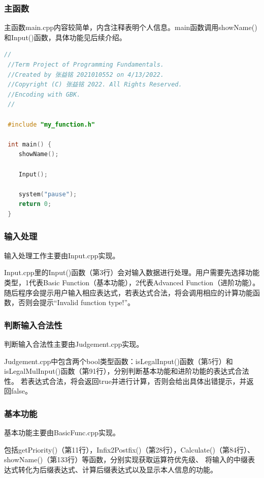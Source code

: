 \documentclass[a4paper, 11pt, UTF8]{ctexart}
\begin{document}
\subsubsection{主函数}

主函数main.cpp内容较简单，内含注释表明个人信息。main函数调用showName()和Input()函数，具体功能见后续介绍。

\begin{lstlisting}[language=C++, basicstyle=\ttfamily]
 //
 //Term Project of Programming Fundamentals.
 //Created by 张益铭 2021010552 on 4/13/2022.
 //Copyright (C) 张益铭 2022. All Rights Reserved.
 //Encoding with GBK.
 //

 #include "my_function.h"

 int main() {
    showName();
    
    Input();
    
    system("pause");
    return 0;
 }    
\end{lstlisting}

\subsubsection{输入处理}

输入处理工作主要由Input.cpp实现。

Input.cpp里的Input()函数（第3行）会对输入数据进行处理。用户需要先选择功能类型，1代表Basic Function（基本功能），2代表Advanced Function（进阶功能）。
随后程序会提示用户输入相应表达式，若表达式合法，将会调用相应的计算功能函数，否则会提示“Invalid function type!”。

\subsubsection{判断输入合法性}

判断输入合法性主要由Judgement.cpp实现。

Judgement.cpp中包含两个bool类型函数：isLegalInput()函数（第5行）和isLegalMulInput()函数（第91行），分别判断基本功能和进阶功能的表达式合法性。
若表达式合法，将会返回true并进行计算，否则会给出具体出错提示，并返回false。

\subsubsection{基本功能}

基本功能主要由BasicFunc.cpp实现。

包括getPriority()（第11行），Infix2Postfix()（第28行），Calculate()（第84行）、showName()（第133行）等函数，分别实现获取运算符优先级、
将输入的中缀表达式转化为后缀表达式、计算后缀表达式以及显示本人信息的功能。
\end{document}
